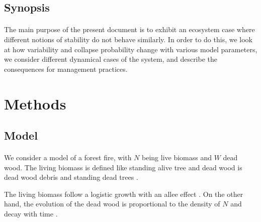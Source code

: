 \documentclass{article}
\begin{document}
\newpage


\subsection*{Synopsis}

\paragraph{}
The main purpose of the present document is to exhibit an ecosystem case where different notions of stability do not behave similarly. In order to do this, we look at how variability and collapse probability change with various model parameters, we consider different dynamical cases of the system, and describe the consequences for management practices.












\newpage
\section{Methods}


\subsection{Model}


\paragraph{}
We consider a model of a forest fire, with $N$ being live biomass and $W$ dead wood. The living biomass is defined like standing alive tree and dead wood is dead wood debris and standing dead trees \cite{russell2015quantifying}.

The living biomass follow a logistic growth \cite{tsoularis2002analysis} \cite{jensen1975comparison} with an allee effect \cite{stephens1999allee} \cite{amarasekare1998allee}. On the other hand, the evolution of the dead wood is proportional to the density of $N$ and decay with time \cite{kahl_wood_2017} \cite{shorohova_stump_2012} \cite{christensen_estimation_1977} \cite{delaney_quantity_1998} \cite{barbosa_decomposition_2017} \cite{fravolini_quantifying_2018} \cite{wilson_dynamics_2005} \cite{zielonka_dynamics_nodate}.
\end{document}
